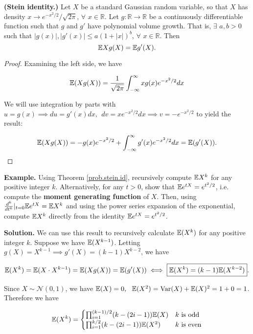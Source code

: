 \begin{theorem} \textbf{(Stein identity.)}\label{prob.stein.id} Let $X$ be a standard Gaussian random variable, so that $X$ has density $x\to e^{-x^{2}/2}/\sqrt{2\pi}$, $\forall$ $x\in\mathbb{R}$.  Let $g : \mathbb{R}\to\mathbb{R}$ be a continuously differentiable function such that $g$ and $g'$ have polynomial volume growth.  That is, $\exists$ $a,b>0$ such that $|{g(x)}|,|g'(x)|\leq a(1+|x|)^{b}$, $\forall$ $x\in\mathbb{R}$. Then 
$$\E Xg(X)=\E g'(X).$$

\end{theorem}


\begin{proof}Examining the left side, we have

\[
\E(X g(X)) = \frac{1}{\sqrt{2 \pi}} \int_{-\infty}^\infty x g(x)  e^{-x^2/2} dx
\]

We will use integration by parts with \(u = g(x) \implies du = g'(x)dx, \ \ dv = xe^{-x^2/2} dx \implies v = -e^{-x^2/2}\) to yield the result:

\[
\E(X g(X)) = -g(x)e^{-x^2/2} + \int_{-\infty}^\infty g'(x) e^{-x^2/2} dx = \E(g'(X)).
\]

\end{proof}

\textbf{Example.} Using Theorem \ref{prob.stein.id}, recursively compute $\E X^{k}$ for any positive integer $k$. Alternatively, for any $t>0$, show that $\E e^{tX}=e^{t^{2}/2}$, i.e. compute the \textbf{moment generating function} of $X$.  Then, using $\frac{d^{k}}{dt^{k}}|_{t=0}\E e^{tX}=\E X^{k}$ and using the power series expansion of the exponential, compute $\E X^{k}$ directly from the identity $\E e^{tX}=e^{t^{2}/2}$.

\textbf{Solution.} We can use this result to recursively calculate \(\E(X^k)\) for any positive integer \(k\). Suppose we have \(\E(X^{k-1})\). Letting \(g(X) = X^{k-1} \implies g'(X) = (k-1)X^{k-2}\), we have 

\[
\E(X^k) = \E(X \cdot X^{k-1}) = \E(X g(X)) = \E(g'(X)) \iff \boxed{\E(X^k) = (k-1)\E(X^{k-2})}.
\]

Since \(X \sim \mathcal{N}(0,1)\), we have \(\E(X)=0, \ \ \E(X^2) = \Var(X) + \E(X)^2 = 1 + 0 = 1\). Therefore we have

\[
\E(X^k) = \begin{cases} \prod_{i=1}^{(k-1)/2} (k-(2i-1)) \E(X) & k \text{ is odd} \\
 \prod_{i=1}^{k/2} (k-(2i-1)) \E(X^2) & k \text{ is even} \end{cases}
\]

